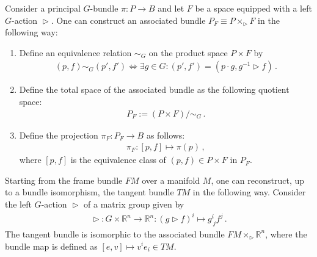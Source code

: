     \begin{construct}\label{bundle:associated_bundle}
        Consider a principal $G$-bundle $\pi:P\rightarrow B$ and let $F$ be a space equipped with a left $G$-action $\vartriangleright$. One can construct an associated bundle $P_F\equiv P \times_\vartriangleright F$ in the following way:
        \begin{enumerate}
            \item Define an equivalence relation $\sim_G$ on the product space $P\times F$ by
                \begin{gather}
                    \label{bundle:associated_bundle_equivalence}
                    (p,f)\sim_G(p',f')\iff\exists g\in G:(p',f') = (p\cdot g,g^{-1}\vartriangleright f)\,.
                \end{gather}
            \item Define the total space of the associated bundle as the following quotient space:
                \begin{gather}
                    P_F := (P\times F)/\sim_G\,.
                \end{gather}
            \item Define the projection $\pi_F:P_F\rightarrow B$ as follows:
                \begin{gather}
                    \pi_F:[p,f]\mapsto\pi(p)\,,
                \end{gather}
            where $[p,f]$ is the equivalence class of $(p,f)\in P\times F$ in $P_F$.
        \end{enumerate}
    \end{construct}
    \begin{example}
        Starting from the frame bundle $FM$ over a manifold $M$, one can reconstruct, up to a bundle isomorphism, the tangent bundle $TM$ in the following way. Consider the left $G$-action $\vartriangleright$ of a matrix group given by
        \begin{gather}
            \vartriangleright:G\times\mathbb{R}^n\rightarrow\mathbb{R}^n:(g\vartriangleright f)^i \mapsto g^i_{\ j}f^j\,.
        \end{gather}
        The tangent bundle is isomorphic to the associated bundle $FM\times_\vartriangleright\mathbb{R}^n$, where the bundle map is defined as $[e,v]\mapsto v^ie_i\in TM$.
    \end{example}

